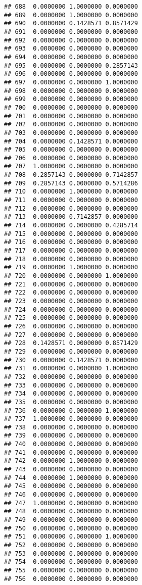 \documentclass[
]{article}
\begin{document}
\begin{verbatim}
## 688  0.0000000 1.0000000 0.0000000
## 689  0.0000000 1.0000000 0.0000000
## 690  0.0000000 0.1428571 0.8571429
## 691  0.0000000 0.0000000 0.0000000
## 692  0.0000000 0.0000000 0.0000000
## 693  0.0000000 0.0000000 0.0000000
## 694  0.0000000 0.0000000 0.0000000
## 695  0.0000000 0.0000000 0.2857143
## 696  0.0000000 0.0000000 0.0000000
## 697  0.0000000 0.0000000 1.0000000
## 698  0.0000000 0.0000000 0.0000000
## 699  0.0000000 0.0000000 0.0000000
## 700  0.0000000 0.0000000 0.0000000
## 701  0.0000000 0.0000000 0.0000000
## 702  0.0000000 0.0000000 0.0000000
## 703  0.0000000 0.0000000 0.0000000
## 704  0.0000000 0.1428571 0.0000000
## 705  0.0000000 0.0000000 0.0000000
## 706  0.0000000 0.0000000 0.0000000
## 707  1.0000000 0.0000000 0.0000000
## 708  0.2857143 0.0000000 0.7142857
## 709  0.2857143 0.0000000 0.5714286
## 710  0.0000000 1.0000000 0.0000000
## 711  0.0000000 0.0000000 0.0000000
## 712  0.0000000 0.0000000 0.0000000
## 713  0.0000000 0.7142857 0.0000000
## 714  0.0000000 0.0000000 0.4285714
## 715  0.0000000 0.0000000 0.0000000
## 716  0.0000000 0.0000000 0.0000000
## 717  0.0000000 0.0000000 0.0000000
## 718  0.0000000 0.0000000 0.0000000
## 719  0.0000000 1.0000000 0.0000000
## 720  0.0000000 0.0000000 1.0000000
## 721  0.0000000 0.0000000 0.0000000
## 722  0.0000000 0.0000000 0.0000000
## 723  0.0000000 0.0000000 0.0000000
## 724  0.0000000 0.0000000 0.0000000
## 725  0.0000000 0.0000000 0.0000000
## 726  0.0000000 0.0000000 0.0000000
## 727  0.0000000 0.0000000 0.0000000
## 728  0.1428571 0.0000000 0.8571429
## 729  0.0000000 0.0000000 0.0000000
## 730  0.0000000 0.1428571 0.0000000
## 731  0.0000000 0.0000000 1.0000000
## 732  0.0000000 0.0000000 0.0000000
## 733  0.0000000 0.0000000 0.0000000
## 734  0.0000000 0.0000000 0.0000000
## 735  0.0000000 0.0000000 0.0000000
## 736  0.0000000 0.0000000 1.0000000
## 737  1.0000000 0.0000000 0.0000000
## 738  0.0000000 0.0000000 0.0000000
## 739  0.0000000 0.0000000 0.0000000
## 740  0.0000000 0.0000000 0.0000000
## 741  0.0000000 0.0000000 0.0000000
## 742  0.0000000 1.0000000 0.0000000
## 743  0.0000000 0.0000000 0.0000000
## 744  0.0000000 1.0000000 0.0000000
## 745  0.0000000 0.0000000 0.0000000
## 746  0.0000000 0.0000000 0.0000000
## 747  1.0000000 0.0000000 0.0000000
## 748  0.0000000 0.0000000 0.0000000
## 749  0.0000000 0.0000000 0.0000000
## 750  0.0000000 0.0000000 0.0000000
## 751  0.0000000 0.0000000 1.0000000
## 752  0.0000000 0.0000000 0.0000000
## 753  0.0000000 0.0000000 0.0000000
## 754  0.0000000 0.0000000 0.0000000
## 755  0.0000000 0.0000000 0.0000000
## 756  0.0000000 0.0000000 0.0000000

\end{verbatim}
\end{document}

